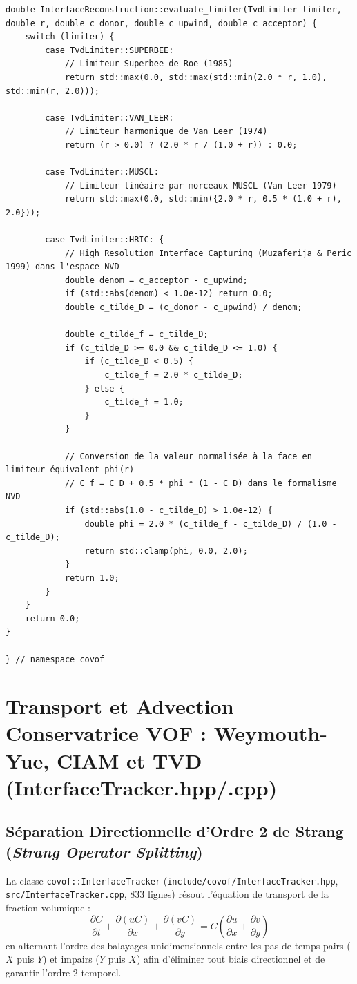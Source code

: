 \documentclass[10pt,a4paper,oneside]{book}
\begin{document}
\begin{lstlisting}[language={[11]C++}]
double InterfaceReconstruction::evaluate_limiter(TvdLimiter limiter, double r, double c_donor, double c_upwind, double c_acceptor) {
    switch (limiter) {
        case TvdLimiter::SUPERBEE:
            // Limiteur Superbee de Roe (1985)
            return std::max(0.0, std::max(std::min(2.0 * r, 1.0), std::min(r, 2.0)));

        case TvdLimiter::VAN_LEER:
            // Limiteur harmonique de Van Leer (1974)
            return (r > 0.0) ? (2.0 * r / (1.0 + r)) : 0.0;

        case TvdLimiter::MUSCL:
            // Limiteur linéaire par morceaux MUSCL (Van Leer 1979)
            return std::max(0.0, std::min({2.0 * r, 0.5 * (1.0 + r), 2.0}));

        case TvdLimiter::HRIC: {
            // High Resolution Interface Capturing (Muzaferija & Peric 1999) dans l'espace NVD
            double denom = c_acceptor - c_upwind;
            if (std::abs(denom) < 1.0e-12) return 0.0;
            double c_tilde_D = (c_donor - c_upwind) / denom;

            double c_tilde_f = c_tilde_D;
            if (c_tilde_D >= 0.0 && c_tilde_D <= 1.0) {
                if (c_tilde_D < 0.5) {
                    c_tilde_f = 2.0 * c_tilde_D;
                } else {
                    c_tilde_f = 1.0;
                }
            }

            // Conversion de la valeur normalisée à la face en limiteur équivalent phi(r)
            // C_f = C_D + 0.5 * phi * (1 - C_D) dans le formalisme NVD
            if (std::abs(1.0 - c_tilde_D) > 1.0e-12) {
                double phi = 2.0 * (c_tilde_f - c_tilde_D) / (1.0 - c_tilde_D);
                return std::clamp(phi, 0.0, 2.0);
            }
            return 1.0;
        }
    }
    return 0.0;
}

} // namespace covof

\end{lstlisting}

\chapter{Transport et Advection Conservatrice VOF : Weymouth-Yue, CIAM et TVD (InterfaceTracker.hpp/.cpp)}
\section{Séparation Directionnelle d'Ordre 2 de Strang (\emph{Strang Operator Splitting})}
La classe \texttt{covof::InterfaceTracker} (\texttt{include/covof/InterfaceTracker.hpp}, \texttt{src/InterfaceTracker.cpp}, 833 lignes) résout l'équation de transport de la fraction volumique :
\begin{equation}
  \frac{\partial C}{\partial t} + \frac{\partial (u C)}{\partial x} + \frac{\partial (v C)}{\partial y} = C \left( \frac{\partial u}{\partial x} + \frac{\partial v}{\partial y} \right)
\end{equation}
en alternant l'ordre des balayages unidimensionnels entre les pas de temps pairs ($X$ puis $Y$) et impairs ($Y$ puis $X$) afin d'éliminer tout biais directionnel et de garantir l'ordre 2 temporel.
\end{document}
